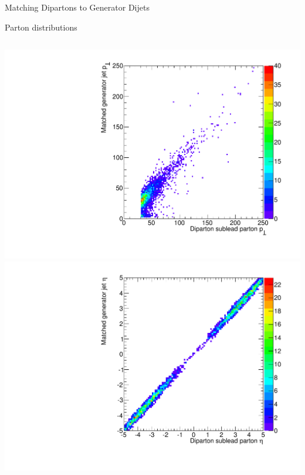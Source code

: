 \documentclass[8pt]{beamer}
\begin{document}
\begin{frame}{Matching Dipartons to Generator Dijets}
\begin{block}{Parton distributions}
\begin{columns}
  \centering
  \includegraphics[width=0.8\linewidth]{img/SelDiParton_MatchedGenJet_Parton2_Pt.pdf} \\
  \includegraphics[width=0.8\linewidth]{img/SelDiParton_MatchedGenJet_Parton2_Eta.pdf}


\end{columns}
\end{block}
\end{frame}
\end{document}
